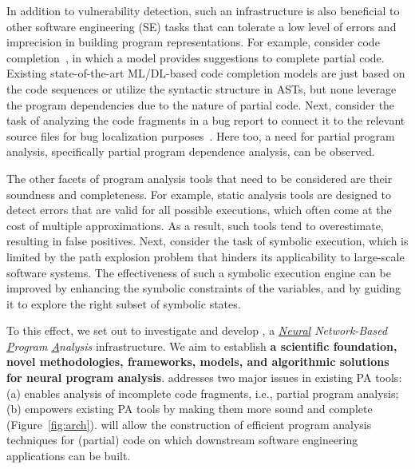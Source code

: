 In addition to vulnerability detection, such an 
infrastructure
is also beneficial to other software engineering (SE) tasks that can tolerate a low level of errors and imprecision in building program representations. For example, consider code completion~\cite{codefill-icse22,facebook-icse21}, in which a model provides suggestions to complete partial code. Existing state-of-the-art ML/DL-based code completion models are just based on the code sequences or utilize the syntactic structure in ASTs, but none leverage the program dependencies due to the nature of partial code. Next, consider the task of analyzing the code fragments in a bug report to connect it to the relevant source files for bug localization purposes~\cite{euler-fse19,icpc17}. Here too, a need for partial program analysis, specifically partial program dependence analysis, can be observed.

The other facets of program analysis tools that need to be considered are their soundness and completeness. For example, static analysis tools are designed to detect errors that are valid for all possible executions, which often come at the cost of multiple approximations. As a result, such tools tend to overestimate, resulting in false positives. Next, consider the task of symbolic execution, which is limited by the path explosion problem that hinders its applicability to large-scale software systems. The effectiveness of such a symbolic execution engine can be improved by enhancing the symbolic constraints of the variables, and by guiding it to explore the right subset of symbolic states. 

To this effect, we set out to investigate and develop {\tool}, a {\em \underline{Neural} Network-Based \underline{P}rogram \underline{A}nalysis} infrastructure. We aim to establish {\bf a scientific foundation, novel methodologies, frameworks, models, and algorithmic solutions for neural program analysis}. {\tool} addresses two major issues in existing PA tools: (a) enables analysis of incomplete code fragments, i.e., partial program analysis; (b) empowers existing PA tools by making them more sound and complete (Figure~\ref{fig:arch}). {\tool} will allow the construction of efficient program analysis techniques for (partial) code on which downstream software engineering applications can be built.

